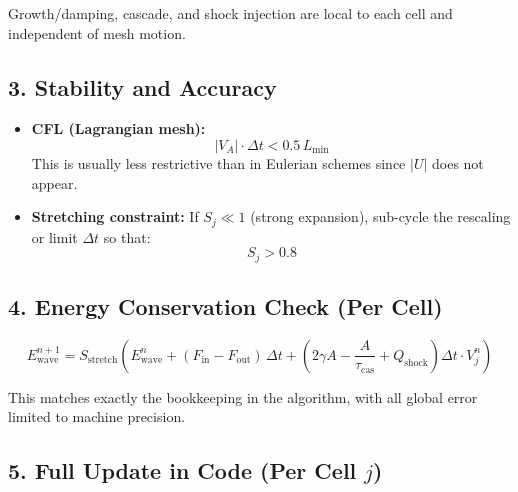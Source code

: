 Growth/damping, cascade, and shock injection are local to each cell and independent of mesh motion.

\subsection*{3. Stability and Accuracy}

\begin{itemize}
    \item \textbf{CFL (Lagrangian mesh):}
    \[
    |V_A| \cdot \Delta t < 0.5 \, L_{\min}
    \]
    This is usually less restrictive than in Eulerian schemes since $|U|$ does not appear.
    
    \item \textbf{Stretching constraint:}
    If $S_j \ll 1$ (strong expansion), sub-cycle the rescaling or limit $\Delta t$ so that:
    \[
    S_j > 0.8
    \]
\end{itemize}

\subsection*{4. Energy Conservation Check (Per Cell)}

\[
E_{\text{wave}}^{n+1}
= S_{\text{stretch}} \left( E_{\text{wave}}^n
   + (F_{\text{in}} - F_{\text{out}})\, \Delta t
   + \left( 2\gamma A - \frac{A}{\tau_{\text{cas}}} + Q_{\text{shock}} \right) \Delta t \cdot V_j^n \right)
\]

This matches exactly the bookkeeping in the algorithm, with all global error limited to machine precision.

\subsection*{5. Full Update in Code (Per Cell $j$)}

